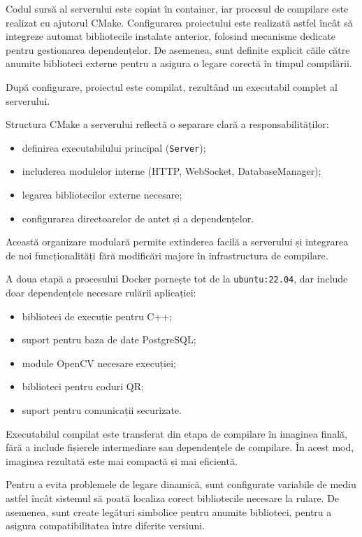 Codul sursă al serverului este copiat în container, iar procesul de compilare este realizat cu ajutorul CMake. Configurarea proiectului este realizată astfel încât să integreze automat bibliotecile instalate anterior, folosind mecanisme dedicate pentru gestionarea dependențelor. De asemenea, sunt definite explicit căile către anumite biblioteci externe pentru a asigura o legare corectă în timpul compilării.

După configurare, proiectul este compilat, rezultând un executabil complet al serverului.

Structura CMake a serverului reflectă o separare clară a responsabilităților:
\begin{itemize}
    \item definirea executabilului principal (\texttt{Server});
    \item includerea modulelor interne (HTTP, WebSocket, DatabaseManager);
    \item legarea bibliotecilor externe necesare;
    \item configurarea directoarelor de antet și a dependențelor.
\end{itemize}

Această organizare modulară permite extinderea facilă a serverului și integrarea de noi funcționalități fără modificări majore în infrastructura de compilare.

A doua etapă a procesului Docker pornește tot de la \texttt{ubuntu:22.04}, dar include doar dependențele necesare rulării aplicației:
\begin{itemize}
    \item biblioteci de execuție pentru C++;
    \item suport pentru baza de date PostgreSQL;
    \item module OpenCV necesare execuției;
    \item biblioteci pentru coduri QR;
    \item suport pentru comunicații securizate.
\end{itemize}

Executabilul compilat este transferat din etapa de compilare în imaginea finală, fără a include fișierele intermediare sau dependențele de compilare. În acest mod, imaginea rezultată este mai compactă și mai eficientă.

Pentru a evita problemele de legare dinamică, sunt configurate variabile de mediu astfel încât sistemul să poată localiza corect bibliotecile necesare la rulare. De asemenea, sunt create legături simbolice pentru anumite biblioteci, pentru a asigura compatibilitatea între diferite versiuni.

